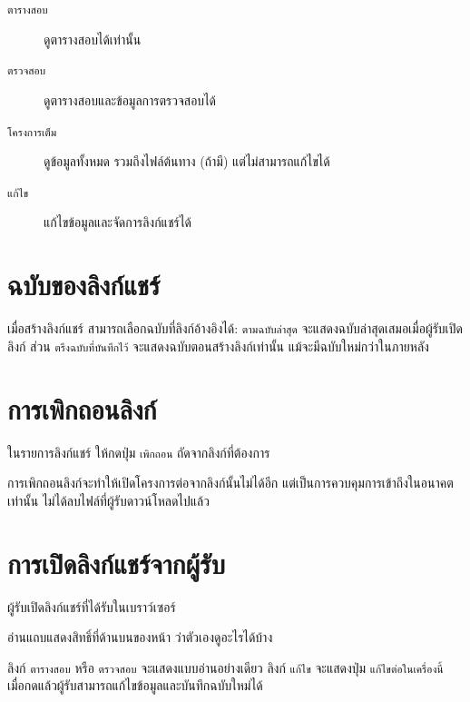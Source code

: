 \begin{description}
  \item[\texttt{ตารางสอบ}] ดูตารางสอบได้เท่านั้น
  \item[\texttt{ตรวจสอบ}] ดูตารางสอบและข้อมูลการตรวจสอบได้
  \item[\texttt{โครงการเต็ม}] ดูข้อมูลทั้งหมด รวมถึงไฟล์ต้นทาง (ถ้ามี)
        แต่ไม่สามารถแก้ไขได้
  \item[\texttt{แก้ไข}] แก้ไขข้อมูลและจัดการลิงก์แชร์ได้
\end{description}

\section{ฉบับของลิงก์แชร์}

เมื่อสร้างลิงก์แชร์ สามารถเลือกฉบับที่ลิงก์อ้างอิงได้:
\texttt{ตามฉบับล่าสุด} จะแสดงฉบับล่าสุดเสมอเมื่อผู้รับเปิดลิงก์
ส่วน \texttt{ตรึงฉบับที่บันทึกไว้} จะแสดงฉบับตอนสร้างลิงก์เท่านั้น
แม้จะมีฉบับใหม่กว่าในภายหลัง

\section{การเพิกถอนลิงก์}

\begin{steps}
  \item ในรายการลิงก์แชร์ ให้กดปุ่ม \texttt{เพิกถอน} ถัดจากลิงก์ที่ต้องการ
\end{steps}

\begin{caution}
การเพิกถอนลิงก์จะทำให้เปิดโครงการต่อจากลิงก์นั้นไม่ได้อีก
แต่เป็นการควบคุมการเข้าถึงในอนาคตเท่านั้น
ไม่ได้ลบไฟล์ที่ผู้รับดาวน์โหลดไปแล้ว
\end{caution}

\section{การเปิดลิงก์แชร์จากผู้รับ}

\begin{steps}
  \item ผู้รับเปิดลิงก์แชร์ที่ได้รับในเบราว์เซอร์
  \item อ่านแถบแสดงสิทธิ์ที่ด้านบนของหน้า ว่าตัวเองดูอะไรได้บ้าง
\end{steps}

\begin{expected}
ลิงก์ \texttt{ตารางสอบ} หรือ \texttt{ตรวจสอบ} จะแสดงแบบอ่านอย่างเดียว
ลิงก์ \texttt{แก้ไข} จะแสดงปุ่ม \texttt{แก้ไขต่อในเครื่องนี้}
เมื่อกดแล้วผู้รับสามารถแก้ไขข้อมูลและบันทึกฉบับใหม่ได้
\end{expected}

